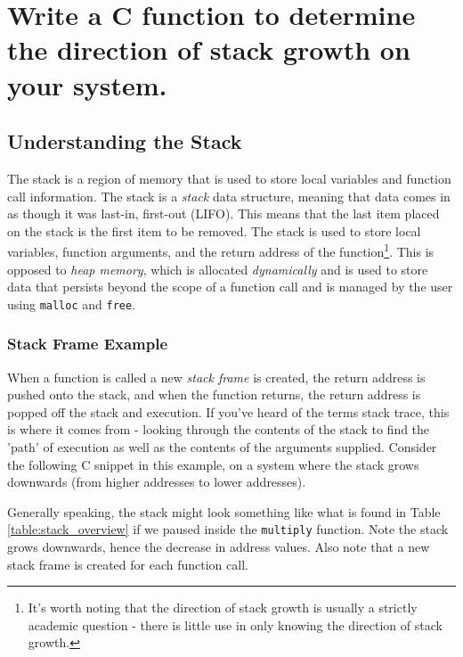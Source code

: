 \documentclass[main.tex]{subfiles}
\begin{document}
\section{Write a C function to determine the direction of stack growth on your system.}
\spoilerline

\subsection{Understanding the Stack}
The stack is a region of memory that is used to store local variables and function call information. The stack is a \textit{stack} data structure, meaning that data comes in as though it was last-in, first-out (LIFO). This means that the last item placed on the stack is the first item to be removed. The stack is used to store local variables, function arguments, and the return address of the function\footnote{It's worth noting that the direction of stack growth is usually a strictly academic question - there is little use in only knowing the direction of stack growth.}. This is opposed to \textit{heap memory}, which is allocated \textit{dynamically} and is used to store data that persists beyond the scope of a function call and is managed by the user using \texttt{malloc} and \texttt{free}.

\subsubsection{Stack Frame Example}
When a function is called a new \textit{stack frame} is created, the return address is pushed onto the stack, and when the function returns, the return address is popped off the stack and execution. If you've heard of the terms stack trace, this is where it comes from - looking through the contents of the stack to find the 'path' of execution as well as the contents of the arguments supplied.
\newline
\newnoindentpara Consider the following C snippet in this example, on a system where the stack grows downwards (from higher addresses to lower addresses). 


\noindent Generally speaking, the stack might look something like what is found in Table \ref{table:stack_overview} if we paused inside the \texttt{multiply} function. Note the stack grows downwards, hence the decrease in address values. Also note that a new stack frame is created for each function call.
\end{document}
